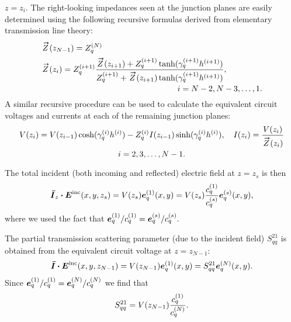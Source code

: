 $z=z_i$.  The right-looking impedances seen at the junction planes
are easily determined using the following recursive
formulas derived from elementary transmission line theory:
\begin{subequations}
  \begin{align}
    &\Zright(z_{N-1}) = Z_{q}^{(N)} \\
    &\Zright(z_i) = Z_{q}^{(i+1)} 
    \frac%
    {\Zright(z_{i+1}) + Z_{q}^{(i+1)}\tanh(\gamma_{q}^{(i+1)} h^{(i+1)})}%
    {Z_{q}^{(i+1)} + \Zright(z_{i+1})\tanh(\gamma_{q}^{(i+1)} h^{(i+1)})}, \notag \\
    & \mkern300mu i = N-2,N-3,\ldots,1.
  \end{align}
\end{subequations}
A similar recursive procedure can be used to calculate the
equivalent circuit voltages and currents
at each of the remaining junction planes:
\begin{multline}
  V(z_i) = V(z_{i-1}) \cosh(\gamma_{q}\eye h\eye)
  - Z_q\eye
  I(z_{i-1}) \sinh (\gamma_{q}\eye h\eye), \quad
  I(z_i) = \frac{V(z_i)}{\Zright(z_i)} \\
  i = 2,3,\ldots,N-1. 
  \label{eq:recurseright}
\end{multline}

The total incident (both incoming and reflected) electric field at
$z=z_s$ is then
\begin{equation}
  \boldsymbol{\bar{I}}_z \boldsymbol{\cdot} \boldsymbol{E}^{\text{inc}}(x,y,z_s) = V(z_s) \boldsymbol{e}_q^{(1)}(x,y)
  = V(z_s) \frac{c_q^{(1)}}{c_q^{(s)}} \boldsymbol{e}_q^{(s)}(x,y),
\end{equation}
where we used the fact that $\boldsymbol{e}_q^{(1)} / c_q^{(1)} = \boldsymbol{e}_q^{(s)} / c_q^{(s)}.$

The partial transmission scattering parameter (due to the incident
field) $S^{21}_{qq}$ is obtained from the equivalent circuit voltage
at $z=z_{N-1}$:
\begin{equation}
  \boldsymbol{\bar{I}} \boldsymbol{\cdot} \boldsymbol{E}^{\text{inc}}(x,y,z_{N-1}) = V(z_{N-1}) \boldsymbol{e}_q^{(1)}(x,y) 
  = S^{21}_{qq} \boldsymbol{e}_q^{(N)}(x,y).
\end{equation}
Since $\boldsymbol{e}_q^{(1)} / c_q^{(1)} = \boldsymbol{e}_q^{(N)} / c_q^{(N)}$ we find that
\begin{equation}
  S^{21}_{qq} = V(z_{N-1}) \frac{c_q^{(1)}}{c_q^{(N)}}.
\end{equation}



